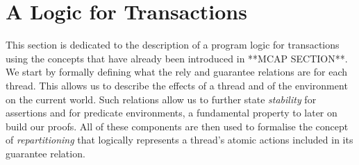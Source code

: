 \section{A Logic for Transactions}

This section is dedicated to the description of a program logic for transactions using the concepts that have already been introduced in **MCAP SECTION**. We start by formally defining what the rely and guarantee relations are for each thread. This allows us to describe the effects of a thread and of the environment on the current world. Such relations allow us to further state \textit{stability} for assertions and for predicate environments, a fundamental property to later on build our proofs. All of these components are then used to formalise the concept of \textit{repartitioning} \cite{cap}\cite{colosl} that logically represents a thread's atomic actions included in its guarantee relation.



\newpage

%

\newpage

%

\newpage

%

\newpage

%